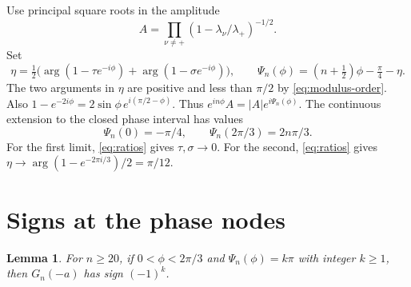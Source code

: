 \documentclass[11pt]{article}
\newtheorem{lemma}{Lemma}
\begin{document}
Use principal square roots in the amplitude
\[
A=\prod_{\nu\ne+}(1-\lambda_\nu/\lambda_+)^{-1/2}.
\]
Set
\begin{equation}
\eta=\tfrac12\big(\arg(1-\tau e^{-i\phi})+\arg(1-\sigma e^{-i\phi})\big),
\qquad
\Psi_n(\phi)=(n+\tfrac12)\phi-\tfrac{\pi}{4}-\eta.
\label{eq:phase}
\end{equation}
The two arguments in $\eta$ are positive and less than $\pi/2$ by \eqref{eq:modulus-order}. Also $1-e^{-2i\phi}=2\sin\phi\,e^{i(\pi/2-\phi)}$. Thus $e^{in\phi}A=|A|e^{i\Psi_n(\phi)}$. The continuous extension to the closed phase interval has values
\begin{equation}
\Psi_n(0)=-\pi/4,\qquad \Psi_n(2\pi/3)=2n\pi/3.
\label{eq:phase-ends}
\end{equation}
For the first limit, \eqref{eq:ratios} gives $\tau,\sigma\to0$. For the second, \eqref{eq:ratios} gives $\eta\to\arg(1-e^{-2\pi i/3})/2=\pi/12$.

\section{Signs at the phase nodes}\label{sec:signs}

\begin{lemma}\label{lem:sign}
For \(n\ge20\), if \(0<\phi<2\pi/3\) and \(\Psi_n(\phi)=k\pi\) with integer \(k\ge1\), then \(G_n(-a)\) has sign \((-1)^k\).
\end{lemma}
\end{document}
